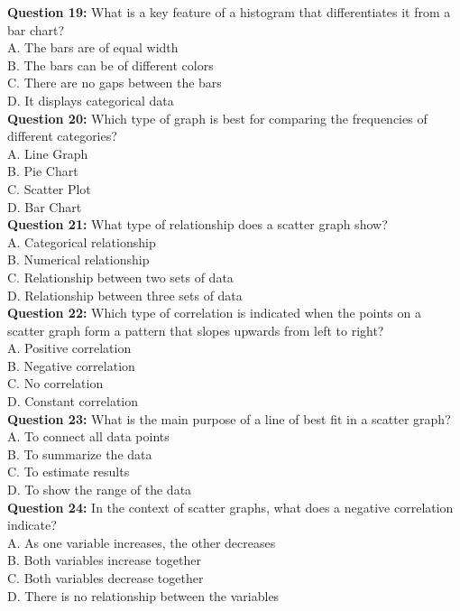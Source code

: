 \documentclass{article}
\begin{document}
\textbf{Question 19:} What is a key feature of a histogram that differentiates it from a bar chart? \\
A. The bars are of equal width \\
B. The bars can be of different colors \\
C. There are no gaps between the bars \\
D. It displays categorical data \\

\textbf{Question 20:} Which type of graph is best for comparing the frequencies of different categories? \\
A. Line Graph \\
B. Pie Chart \\
C. Scatter Plot \\
D. Bar Chart \\


\textbf{Question 21:} What type of relationship does a scatter graph show? \\
A. Categorical relationship \\
B. Numerical relationship \\
C. Relationship between two sets of data \\
D. Relationship between three sets of data \\

\textbf{Question 22:} Which type of correlation is indicated when the points on a scatter graph form a pattern that slopes upwards from left to right? \\
A. Positive correlation \\
B. Negative correlation \\
C. No correlation \\
D. Constant correlation \\

\textbf{Question 23:} What is the main purpose of a line of best fit in a scatter graph? \\
A. To connect all data points \\
B. To summarize the data \\
C. To estimate results \\
D. To show the range of the data \\

\textbf{Question 24:} In the context of scatter graphs, what does a negative correlation indicate? \\
A. As one variable increases, the other decreases \\
B. Both variables increase together \\
C. Both variables decrease together \\
D. There is no relationship between the variables \\
\end{document}
